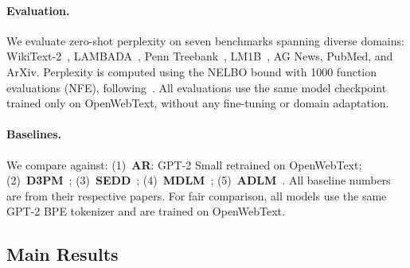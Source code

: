 \documentclass[11pt]{article}
\theoremstyle{remark}
\begin{document}
\paragraph{Evaluation.} We evaluate zero-shot perplexity on seven benchmarks spanning diverse domains: WikiText-2~\citep{wikitext}, LAMBADA~\citep{lambada}, Penn Treebank~\citep{ptb}, LM1B~\citep{lm1b}, AG News, PubMed, and ArXiv. Perplexity is computed using the NELBO bound with 1000 function evaluations (NFE), following~\citet{mdlm}. All evaluations use the same model checkpoint trained only on OpenWebText, without any fine-tuning or domain adaptation.

\paragraph{Baselines.} We compare against: (1)~\textbf{AR}: GPT-2 Small retrained on OpenWebText; (2)~\textbf{D3PM}~\citep{d3pm}; (3)~\textbf{SEDD}~\citep{sedd}; (4)~\textbf{MDLM}~\citep{mdlm}; (5)~\textbf{ADLM}~\citep{adlm}. All baseline numbers are from their respective papers. For fair comparison, all models use the same GPT-2 BPE tokenizer and are trained on OpenWebText.

\subsection{Main Results}

\begin{table}[t]
\centering
\caption{Perplexity comparison across models (lower is better). $\dagger$: results from original papers. All models trained on OpenWebText. All DLM perplexities evaluated at 1000 NFE. \textbf{Train} = trainable parameters; \textbf{Tok.} = total training tokens processed.}
\label{tab:main}
\small
{}
\end{table}
\end{document}
